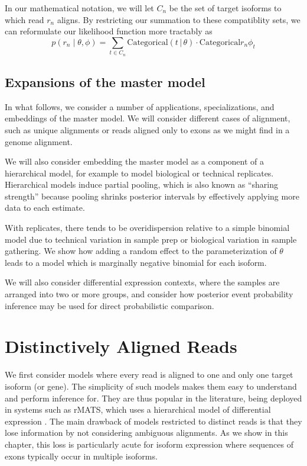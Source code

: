 \documentclass[11pt]{report}
\newcommand{\distro}[3]{\textrm{#1}\!\left( #2 \,|\, #3\right)}
\begin{document}
In our mathematical notation, we will let $C_n$ be the set of target
isoforms to which read $r_n$ aligns.  By restricting our summation to
these compatiblity sets, we can reformulate our likelihood function
more tractably as
\[
  p(r_n \mid \theta, \phi)
  = \textstyle \sum_{t \in C_n}
  \distro{Categorical}{t}{\theta}
  \cdot \textrm{Categorical}{r_n}{\phi_t}
\]

\section{Expansions of the master model}

In what follows, we consider a number of applications,
specializations, and embeddings of the master model. We will consider
different cases of alignment, such as unique alignments or reads
aligned only to exons as we might find in a genome alignment.

We will also consider embedding the master model as a component of a
hierarchical model, for example to model biological or technical
replicates.  Hierarchical models induce partial pooling, which is also
known as ``sharing strength'' because pooling shrinks posterior intervals
by effectively applying more data to each estimate.

With replicates, there tends to be overidispersion relative to a
simple binomial model due to technical variation in sample prep or
biological variation in sample gathering.  We show how adding a random
effect to the parameterization of $\theta$ leads to a model which is
marginally negative binomial for each isoform.

We will also consider differential expression contexts, where the
samples are arranged into two or more groups, and consider how
posterior event probability inference may be used for direct
probabilistic comparison.


\chapter{Distinctively Aligned Reads}

We first consider models where every read is aligned to one and only
one target isoform (or gene).  The simplicity of such models makes
them easy to understand and perform inference for.  They are thus
popular in the literature, being deployed in systems such as rMATS,
which uses a hierarchical model of differential expression
\citep{shen2014rmats}.  The main drawback of models restricted to
distinct reads is that they lose information by not considering
ambiguous alignments.  As we show in this chapter, this loss is
particularly acute for isoform expression where sequences of exons
typically occur in multiple isoforms.
\end{document}
